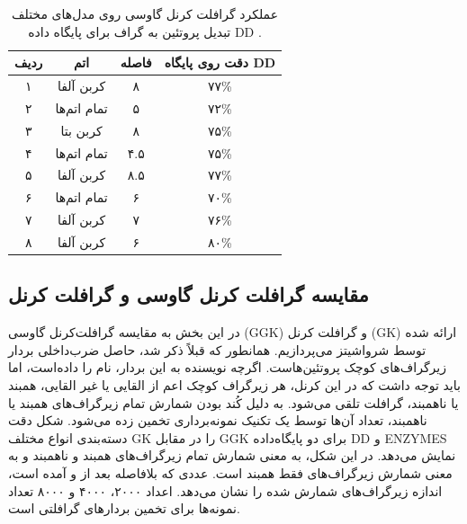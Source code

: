 \begin{table}[ht]
\centering
\begin{tabular}{| c | c | c | c |}
    \hline
    ردیف & اتم & فاصله & دقت روی پایگاه DD \\ \hline
۱ & کربن آلفا & ۸ & ۷۷\% \\ \hline
۲ & تمام اتم‌ها & ۵ & ۷۲\% \\ \hline
۳ & کربن بتا & ۸ & ۷۵\% \\ \hline
۴ & تمام اتم‌ها & ۴.۵ & ۷۵\% \\ \hline
۵ & کربن آلفا & ۸.۵ & ۷۷\% \\ \hline
۶ & تمام اتم‌ها & ۶ & ۷۰\% \\ \hline
۷ & کربن آلفا & ۷ & ۷۶\% \\ \hline
۸ & کربن آلفا & ۶ & ۸۰\% \\ \hline
\end{tabular}
\caption[عملکرد گرافلت کرنل گاوسی روی مدل‌های گرافی پروتئین]{
عملکرد گرافلت کرنل گاوسی روی مدل‌های مختلف تبدیل پروتئین به گراف برای پایگاه داده DD .
}
\label{tab:ggk-on-rigs}
\end{table}

\subsection{مقایسه گرافلت کرنل گاوسی و گرافلت کرنل}
در این بخش به مقایسه گرافلت‌کرنل گاوسی (GGK) و گرافلت کرنل (GK) ارائه شده توسط شرواشیتز می‌پردازیم. همانطور که قبلاً ذکر شد،  حاصل ضرب‌داخلی بردار زیرگراف‌های کوچک پروتئین‌هاست. اگرچه نویسنده به این بردار، نام  را داده‌است، اما باید توجه داشت که در این کرنل، هر زیرگراف کوچک اعم از القایی یا غیر القایی، همبند یا ناهمبند، گرافلت تلقی می‌شود. به دلیل کُند بودن شمارش تمام زیرگراف‌های همبند یا ناهمبند، تعداد آن‌ها توسط یک تکنیک نمونه‌برداری تخمین زده می‌شود. شکل  دقت دسته‌بندی انواع مختلف GK را در مقابل GGK برای دو پایگاه‌داده DD و ENZYMES نمایش می‌دهد. در این شکل،  به معنی شمارش تمام زیرگراف‌های همبند و ناهمبند و  به معنی شمارش زیرگراف‌های فقط همبند است. عددی که بلافاصله بعد از  و  آمده است، اندازه زیرگراف‌های شمارش شده را نشان می‌دهد. اعداد ۲۰۰۰، ۴۰۰۰ و ۸۰۰۰ تعداد نمونه‌ها برای تخمین بردارهای گرافلتی است.

